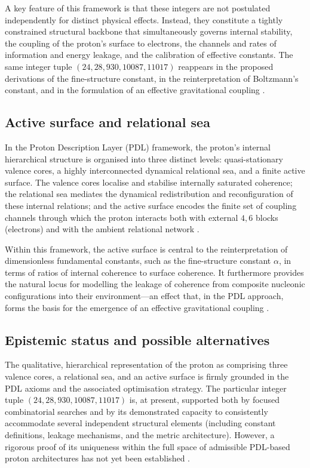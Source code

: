 \documentclass{article}
\begin{document}
A key feature of this framework is that these integers are not postulated independently for distinct physical effects. Instead, they constitute a tightly constrained structural backbone that simultaneously governs internal stability, the coupling of the proton’s surface to electrons, the channels and rates of information and energy leakage, and the calibration of effective constants. The same integer tuple \((24,28,930,10087,11017)\) reappears in the proposed derivations of the fine-structure constant, in the reinterpretation of Boltzmann’s constant, and in the formulation of an effective gravitational coupling \cite{PDL_intro,Alpha_PDL_v2_2026,Born_Golden_v2_2026}.

\subsection{Active surface and relational sea}
\label{subsec:active_surface}

In the Proton Description Layer (PDL) framework, the proton’s internal hierarchical structure is organised into three distinct levels: quasi-stationary valence cores, a highly interconnected dynamical relational sea, and a finite active surface. The valence cores localise and stabilise internally saturated coherence; the relational sea mediates the dynamical redistribution and reconfiguration of these internal relations; and the active surface encodes the finite set of coupling channels through which the proton interacts both with external \(4,6\) blocks (electrons) and with the ambient relational network
\cite{PDL_Main_2026,Born_Golden_v2_2026}.

Within this framework, the active surface is central to the reinterpretation of dimensionless fundamental constants, such as the fine-structure constant \(\alpha\), in terms of ratios of internal coherence to surface coherence. It furthermore provides the natural locus for modelling the leakage of coherence from composite nucleonic configurations into their environment—an effect that, in the PDL approach, forms the basis for the emergence of an effective gravitational coupling
\cite{Alpha_PDL_v2_2026,Exponent_18_PDL_2026}.

\subsection{Epistemic status and possible alternatives}
\label{subsec:proton_status}

The qualitative, hierarchical representation of the proton as comprising three valence cores, a relational sea, and an active surface is firmly grounded in the PDL axioms and the associated optimisation strategy. The particular integer tuple \((24,28,930,10087,11017)\) is, at present, supported both by focused combinatorial searches and by its demonstrated capacity to consistently accommodate several independent structural elements (including constant definitions, leakage mechanisms, and the metric architecture). However, a rigorous proof of its uniqueness within the full space of admissible PDL-based proton architectures has not yet been established
\cite{Combinatorial_Proton_v2_2026,PDL_position}.
\end{document}
